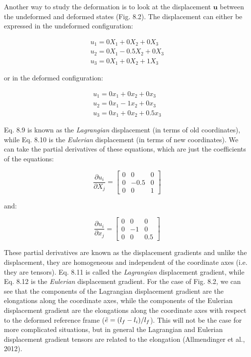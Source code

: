 \documentclass[a4paper , 12pt]{book}
\begin{document}
Another way to study the deformation is to look at the displacement $\mathbf{u}$ between the undeformed and deformed states (Fig. 8.2). The displacement can either be expressed in the undeformed configuration:

\begin{equation}
    \begin{gathered}
        u_1 = 0 X_1 + 0 X_2 + 0 X_3 \\
        u_2 = 0 X_1 - 0.5 X_2 + 0 X_3 \\
        u_3 = 0 X_1 + 0 X_2 + 1 X_3
    \end{gathered}
\end{equation}

or in the deformed configuration:

\begin{equation}
    \begin{gathered}
        u_1 = 0 x_1 + 0 x_2 + 0 x_3 \\
        u_2 = 0 x_1 - 1 x_2 + 0 x_3 \\
        u_3 = 0 x_1 + 0 x_2 + 0.5 x_3
    \end{gathered}
\end{equation}

Eq. 8.9 is known as the \textit{Lagrangian} displacement (in terms of old coordinates), while Eq. 8.10 is the \textit{Eulerian} displacement (in terms of new coordinates). We can take the partial derivatives of these equations, which are just the coefficients of the equations:

\begin{equation}
    \frac{\partial u_i}{\partial X_j}=\begin{bmatrix}0&0&0\\0&-0.5&0\\0&0&1\end{bmatrix}
\end{equation}

and:

\begin{equation}
    \frac{\partial u_i}{\partial x_j}=\begin{bmatrix}0&0&0\\0&-1&0\\0&0&0.5\end{bmatrix}
\end{equation}

These partial derivatives are known as the displacement gradients and unlike the displacement, they are homogeneous and independent of the coordinate axes (i.e. they are tensors). Eq. 8.11 is called the \textit{Lagrangian} displacement gradient, while Eq. 8.12 is the \textit{Eulerian} displacement gradient. For the case of Fig. 8.2, we can see that the components of the Lagrangian displacement gradient are the elongations along the coordinate axes, while the components of the Eulerian displacement gradient are the elongations along the coordinate axes with respect to the deformed reference frame ($\Tilde{e}=(l_f-l_i)/l_f$). This will not be the case for more complicated situations, but in general the Lagrangian and Eulerian displacement gradient tensors are related to the elongation (Allmendinger et al., 2012).
\end{document}
